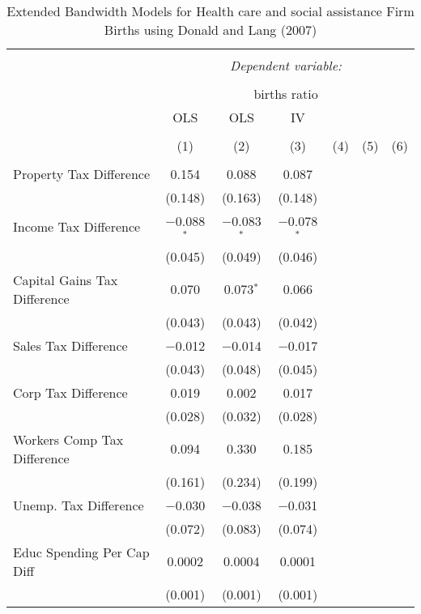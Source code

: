 
\begin{table}[!htbp] \centering 
  \caption{Extended Bandwidth Models for  Health care and social assistance Firm Births using Donald and Lang (2007)} 
  \label{} 
\begin{tabular}{@{\extracolsep{5pt}}lcccccc} 
\\[-1.8ex]\hline 
\hline \\[-1.8ex] 
 & \multicolumn{6}{c}{\textit{Dependent variable:}} \\ 
\cline{2-7} 
\\[-1.8ex] & \multicolumn{6}{c}{births ratio} \\ 
 & OLS & OLS & IV &  &  &  \\ 
\\[-1.8ex] & (1) & (2) & (3) & (4) & (5) & (6)\\ 
\hline \\[-1.8ex] 
 Property Tax Difference & 0.154 & 0.088 & 0.087 &  &  &  \\ 
  & (0.148) & (0.163) & (0.148) &  &  &  \\ 
  Income Tax Difference & $-$0.088$^{*}$ & $-$0.083$^{*}$ & $-$0.078$^{*}$ &  &  &  \\ 
  & (0.045) & (0.049) & (0.046) &  &  &  \\ 
  Capital Gains Tax Difference & 0.070 & 0.073$^{*}$ & 0.066 &  &  &  \\ 
  & (0.043) & (0.043) & (0.042) &  &  &  \\ 
  Sales Tax Difference & $-$0.012 & $-$0.014 & $-$0.017 &  &  &  \\ 
  & (0.043) & (0.048) & (0.045) &  &  &  \\ 
  Corp Tax Difference & 0.019 & 0.002 & 0.017 &  &  &  \\ 
  & (0.028) & (0.032) & (0.028) &  &  &  \\ 
  Workers Comp Tax Difference & 0.094 & 0.330 & 0.185 &  &  &  \\ 
  & (0.161) & (0.234) & (0.199) &  &  &  \\ 
  Unemp. Tax Difference & $-$0.030 & $-$0.038 & $-$0.031 &  &  &  \\ 
  & (0.072) & (0.083) & (0.074) &  &  &  \\ 
  Educ Spending Per Cap Diff & 0.0002 & 0.0004 & 0.0001 &  &  &  \\ 
  & (0.001) & (0.001) & (0.001) &  &  &  \\ 

\end{tabular}
\end{table}

